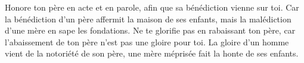 Honore ton père en acte et en parole,
	afin que sa bénédiction vienne sur toi.
Car la bénédiction d’un père affermit la maison de ses enfants,
	mais la malédiction d’une mère en sape les fondations.
Ne te glorifie pas en rabaissant ton père,
	car l’abaissement de ton père n’est pas une gloire pour toi.
La gloire d’un homme vient de la notoriété de son père,
	une mère méprisée fait la honte de ses enfants.
